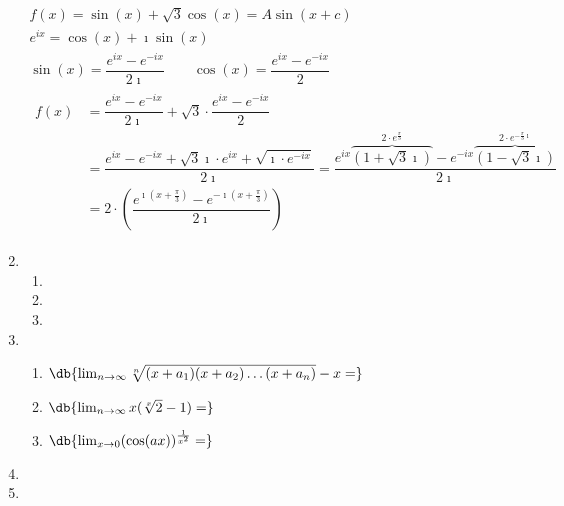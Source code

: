 \begin{enumerate}[label=\color{red}\textbf{\arabic*)}, leftmargin=*]
	$\begin{array}{l}
		f(x)=\sin(x)+\sqrt{3}\cos(x)=A\sin(x+c)\\
		e^{ix}=\cos(x)+\imath\sin(x)\\
		\sin(x)=\dfrac{e^{ix}-e^{-ix}}{2\imath}\qquad\cos(x)=\dfrac{e^{ix}-e^{-ix}}{2}\\
		\begin{aligned}
			f(x)&=\dfrac{e^{ix}-e^{-ix}}{2\imath}+\sqrt{3}\cdot\dfrac{e^{ix}-e^{-ix}}{2}\\
			&=\dfrac{e^{ix}-e^{-ix}+\sqrt{3}\imath\cdot e^{ix}+\sqrt{\imath\cdot e^{-ix}}}{2\imath}=\dfrac{e^{ix}\overbrace{(1+\sqrt{3}\imath)}^{2\cdot e^{\frac{\pi}{3}}}-e^{-ix}\overbrace{(1-\sqrt{3}\imath)}^{2\cdot e^{-\frac{\pi}{3}\imath}}}{2\imath}\\
			&=2\cdot\left(\dfrac{e^{\imath\left(x+\frac{\pi}{3}\right)}-e^{-\imath\left(x+\frac{\pi}{3}\right)}}{2\imath}\right)
		\end{aligned}
	\end{array}$
	\item {}
	\begin{enumerate}[label=\color{red}\alph*)]
		\item {}
		\item {}
		\item {}
	\end{enumerate}
	\item {}
	\begin{enumerate}[label=\color{red}\alph*)]
		\item $\db{\lim_{n\to\infty}\sqrt[n]{(x+a_1)(x+a_2)\dots(x+a_n)}-x=}$
		\item $\db{\lim_{n\to\infty}x(\sqrt[x]{2}-1)=}$
		\item $\db{\lim_{x\to0}(\cos(ax))^{\frac{1}{x^2}}=}$
	\end{enumerate}
	\item {}
	\item {}
	\begin{enumerate}[label=\color{red}\alph*)]

\end{enumerate}
\end{enumerate}
